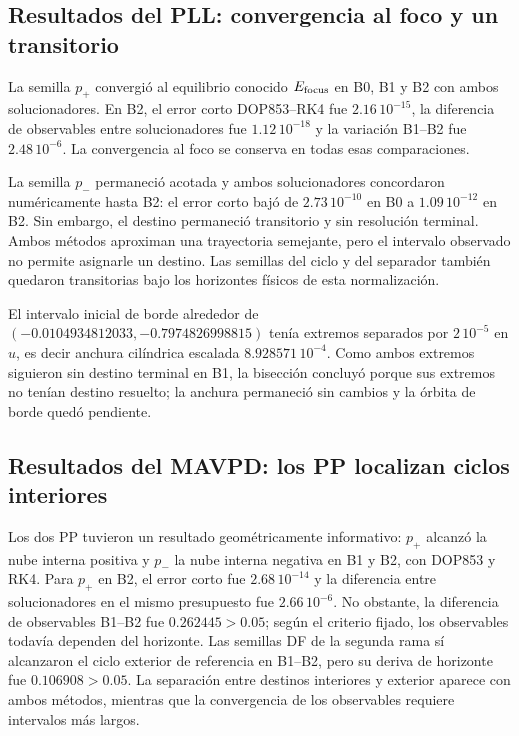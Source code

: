 \subsection{Resultados del PLL: convergencia al foco y un transitorio}
\label{subsec:pilot-pll-results}

La semilla $p_+$ convergió al equilibrio conocido $E_{\rm focus}$ en B0, B1 y
B2 con ambos solucionadores. En B2, el error corto DOP853--RK4 fue
$2.16\,10^{-15}$, la diferencia de observables entre solucionadores fue
$1.12\,10^{-18}$ y la variación B1--B2 fue $2.48\,10^{-6}$.
La convergencia al foco se conserva en todas esas comparaciones.

La semilla $p_-$ permaneció acotada y ambos solucionadores concordaron
numéricamente hasta B2: el error corto bajó de $2.73\,10^{-10}$ en B0 a
$1.09\,10^{-12}$ en B2. Sin embargo, el destino permaneció transitorio y sin
resolución terminal. Ambos métodos aproximan una trayectoria semejante, pero
el intervalo observado no permite asignarle un destino. Las semillas del
ciclo y del separador también quedaron transitorias bajo los horizontes físicos
de esta normalización.

\ifHAFOBasinMaterial
El intervalo inicial de borde alrededor de
$(-0.0104934812033,-0.7974826998815)$ tenía extremos separados por
$2\,10^{-5}$ en $u$, es decir anchura cilíndrica escalada
$8.928571\,10^{-4}$. Como ambos extremos siguieron sin destino terminal en B1,
la bisección concluyó porque sus extremos no tenían destino resuelto; la
anchura permaneció sin cambios y la órbita de borde quedó pendiente.
\fi

\subsection{Resultados del MAVPD: los PP localizan ciclos interiores}
\label{subsec:pilot-mavpd-results}

Los dos PP tuvieron un resultado geométricamente informativo: $p_+$ alcanzó
la nube interna positiva y $p_-$ la nube interna negativa en B1 y B2, con
DOP853 y RK4.
Para $p_+$ en B2, el error corto fue $2.68\,10^{-14}$ y la diferencia entre
solucionadores en el mismo presupuesto fue $2.66\,10^{-6}$. No obstante, la
diferencia de observables B1--B2 fue $0.262445>0.05$; según el criterio
fijado, los observables todavía dependen del horizonte. Las semillas DF de la segunda
rama sí alcanzaron el ciclo exterior de referencia en B1--B2, pero su deriva de
horizonte fue $0.106908>0.05$. La separación entre destinos interiores y
exterior aparece con ambos métodos, mientras que la convergencia de los
observables requiere intervalos más largos.

